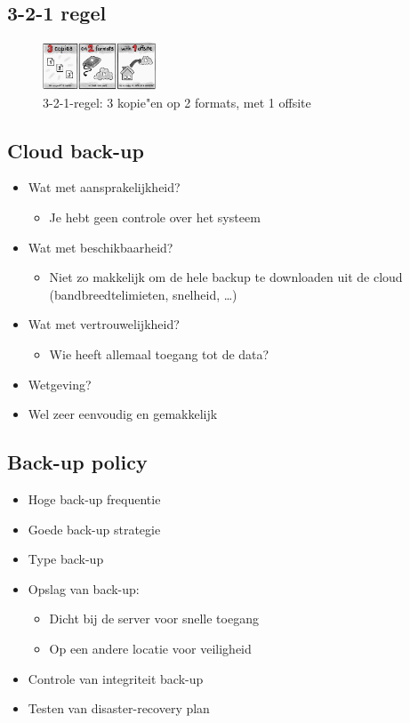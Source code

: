 \documentclass{article}
\begin{document}
\subsection{3-2-1 regel}

\begin{figure}[H]
    \centering
    \includegraphics[width=0.3\textwidth]{321-regel.png}
    \caption{3-2-1-regel: 3 kopie"en op 2 formats, met 1 offsite}
\end{figure}


\subsection{Cloud back-up}

\begin{itemize}
    \item Wat met aansprakelijkheid?
    \begin{itemize}
        \item Je hebt geen controle over het systeem
    \end{itemize}
    \item Wat met beschikbaarheid?
    \begin{itemize}
        \item Niet zo makkelijk om de hele backup te downloaden uit de cloud (bandbreedtelimieten, snelheid, \dots)
    \end{itemize}
    \item Wat met vertrouwelijkheid?
    \begin{itemize}
        \item Wie heeft allemaal toegang tot de data?
    \end{itemize}
    \item Wetgeving?
    \item Wel zeer eenvoudig en gemakkelijk
\end{itemize}

\subsection{Back-up policy}

\begin{itemize}
    \item Hoge back-up frequentie
    \item Goede back-up strategie
    \item Type back-up
    \item Opslag van back-up:
    \begin{itemize}
        \item Dicht bij de server voor snelle toegang
        \item Op een andere locatie voor veiligheid
    \end{itemize}
    \item Controle van integriteit back-up
    \item Testen van disaster-recovery plan
\end{itemize}
\end{document}
